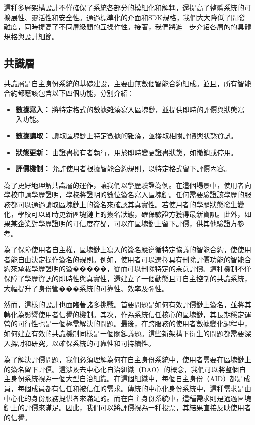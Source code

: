 這種多層架構設計不僅確保了系統各部分的模組化和解耦，還提高了整體系統的可擴展性、靈活性和安全性。通過標準化的介面和SDK規格，我們大大降低了開發難度，同時提高了不同層級間的互操作性。接著，我們將進一步介紹各層的的具體規格與設計細節。
\subsection{共識層}
共識層是自主身份系統的基礎建設，主要由無數個智能合約組成。並且，所有智能合約都應該包含以下四個功能，分別介紹：
\begin{itemize}
  \item \textbf{數據寫入：} 將特定格式的數據雜湊寫入區塊鏈，並提供即時的評價與狀態寫入功能。
  \item \textbf{數據讀取：} 讀取區塊鏈上特定數據的雜湊，並獲取相關評價與狀態資訊。
  \item \textbf{狀態更新：} 由證書擁有者執行，用於即時變更證書狀態，如撤銷或停用。
  \item \textbf{評價機制：} 允許使用者根據智能合約規則，以特定格式留下評價內容。
\end{itemize}
為了更好地理解共識層的運作，讓我們以學歷驗證為例。在這個場景中，使用者向學校申請學歷證明，學校將證明的數位簽名寫入區塊鏈。任何需要驗證該學歷的服務都可以通過讀取區塊鏈上的簽名來確認其真實性。若使用者的學歷狀態發生變化，學校可以即時更新區塊鏈上的簽名狀態，確保驗證方獲得最新資訊。此外，如果某企業對學歷證明的可信度存疑，可以在區塊鏈上留下評價，供其他驗證方參考。

為了保障使用者自主權，區塊鏈上寫入的簽名應遵循特定協議的智能合約，使使用者能自由決定操作簽名的規則。例如，使用者可以選擇具有刪除評價功能的智能合約來承載學歷證明的簽�����，從而可以刪除特定的惡意評價。這種機制不僅保障了學歷資訊的即時性與真實性，還建立了一個動態且可自主控制的共識系統，大幅提升了身份管���系統的可靠性、效率及彈性。


然而，這樣的設計也面臨著諸多挑戰。首要問題是如何有效評價鏈上簽名，並將其轉化為影響使用者信譽的機制。其次，作為系統信任核心的區塊鏈，其長期穩定運營的可行性也是一個極需解決的問題。最後，在跨服務的使用者數據變化過程中，如何建立有效的共識機制同樣是一個關鍵議題。這些新架構下衍生的問題都需要深入探討和研究，以確保系統的可靠性和可持續性。

為了解決評價問題，我們必須理解為何在自主身份系統中，使用者需要在區塊鏈上的簽名留下評價。這涉及去中心化自治組織（DAO）的概念，我們可以將整個自主身份系統視為一個大型自治組織。在這個組織中，每個自主身份（AID）都是成員，每個成員都有信任和被信任的需求。傳統的中心化身份系統中，這種需求是由中心化的身份服務提供者來滿足的。而在自主身份系統中，這種需求則是通過區塊鏈上的評價來滿足。因此，我們可以將評價視為一種投票，其結果直接反映使用者的信譽。

